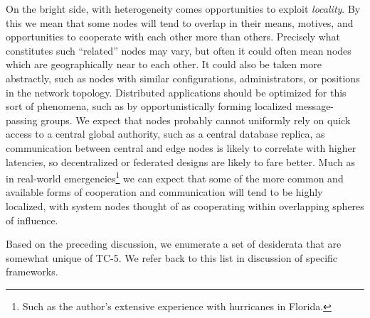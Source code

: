 On the bright side, with heterogeneity comes opportunities to exploit \emph{locality}. By this we mean that some nodes will tend to overlap in their means, motives, and opportunities to cooperate with each other more than others. Precisely what constitutes such ``related'' nodes may vary, but often it could often mean nodes which are geographically near to each other. It could also be taken more abstractly, such as nodes with similar configurations, administrators, or positions in the network topology. Distributed applications should be optimized for this sort of phenomena, such as by opportunistically forming localized message-passing groups. We expect that nodes probably cannot uniformly rely on quick access to a central global authority, such as a central database replica, as communication between central and edge nodes is likely to correlate with higher latencies, so decentralized or federated designs are likely to fare better. Much as in real-world emergencies\footnote{Such as the author's extensive experience with hurricanes in Florida.} we can expect that some of the more common and available forms of cooperation and communication will tend to be highly localized, with system nodes thought of as cooperating within overlapping spheres of influence.

Based on the preceding discussion, we enumerate a set of desiderata that are somewhat unique of TC-5. We refer back to this list in discussion of specific frameworks.


